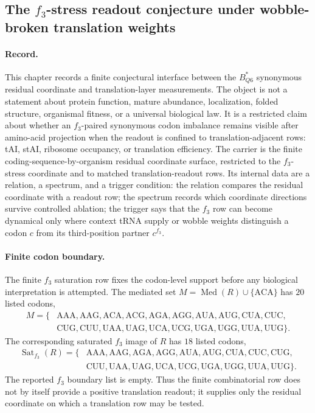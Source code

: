 \subsection{The $f_3$-stress readout conjecture under wobble-broken translation weights}
\label{sec:q6-f3-stress-wobble-broken-translation-readout-cross-layer}

\paragraph{Record.}
This chapter records a finite conjectural interface between the $B^{*}_{Q6}$ synonymous residual coordinate and translation-layer measurements. The object is not a statement about protein function, mature abundance, localization, folded structure, organismal fitness, or a universal biological law. It is a restricted claim about whether an $f_3$-paired synonymous codon imbalance remains visible after amino-acid projection when the readout is confined to translation-adjacent rows: tAI, stAI, ribosome occupancy, or translation efficiency. The carrier is the finite coding-sequence-by-organism residual coordinate surface, restricted to the $f_3$-stress coordinate and to matched translation-readout rows. Its internal data are a relation, a spectrum, and a trigger condition: the relation compares the residual coordinate with a readout row; the spectrum records which coordinate directions survive controlled ablation; the trigger says that the $f_3$ row can become dynamical only where context tRNA supply or wobble weights distinguish a codon $c$ from its third-position partner $c^{f_3}$.

\paragraph{Finite codon boundary.}
The finite $f_3$ saturation row fixes the codon-level support before any biological interpretation is attempted. The mediated set $M=\operatorname{Med}(R)\cup\{\mathrm{ACA}\}$ has $20$ listed codons,
$$
\begin{aligned}
M=\{&\mathrm{AAA},\mathrm{AAG},\mathrm{ACA},\mathrm{ACG},\mathrm{AGA},\mathrm{AGG},\mathrm{AUA},\mathrm{AUG},\mathrm{CUA},\mathrm{CUC},\\
&\mathrm{CUG},\mathrm{CUU},\mathrm{UAA},\mathrm{UAG},\mathrm{UCA},\mathrm{UCG},\mathrm{UGA},\mathrm{UGG},\mathrm{UUA},\mathrm{UUG}\}.
\end{aligned}
$$
The corresponding saturated $f_3$ image of $R$ has $18$ listed codons,
$$
\begin{aligned}
\operatorname{Sat}_{f_3}(R)=\{&\mathrm{AAA},\mathrm{AAG},\mathrm{AGA},\mathrm{AGG},\mathrm{AUA},\mathrm{AUG},\mathrm{CUA},\mathrm{CUC},\mathrm{CUG},\\
&\mathrm{CUU},\mathrm{UAA},\mathrm{UAG},\mathrm{UCA},\mathrm{UCG},\mathrm{UGA},\mathrm{UGG},\mathrm{UUA},\mathrm{UUG}\}.
\end{aligned}
$$
The reported $f_3$ boundary list is empty. Thus the finite combinatorial row does not by itself provide a positive translation readout; it supplies only the residual coordinate on which a translation row may be tested.

